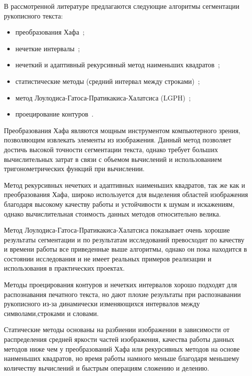 В рассмотренной литературе предлагаются следующие алгоритмы сегментации рукописного текста:
\begin{itemize}
  \item преобразования Хафа~\cite{louloudis_gatos_pratikakis_halatsis};
  \item нечеткие интервалы~\cite{louloudis_gatos_pratikakis_halatsis};
  \item нечеткий и адаптивный рекурсивный метод наименьших \mbox{квадратов~\cite{louloudis_gatos_pratikakis_halatsis};}
  \item статистические методы (средний интервал между строками)~\cite{gomathi_umadevi_mohanavel};
  \item метод Лоулодиса-Гатоса-Пратикакиса-Халатсиса (LGPH)~\cite{louloudis_gatos_pratikakis_halatsis};
  \item проецирование контуров~\cite{louloudis_gatos_pratikakis_halatsis}.
\end{itemize}

Преобразования Хафа являются мощным инструментом компьютерного зрения, позволяющим извлекать элементы из изображения. Данный метод позволяет достичь высокой точности сегментации текста, однако требует больших вычислительных затрат в связи с объемом вычислений и использованием тригонометрических функций при вычислении.

Метод рекурсивных нечетких и адаптивных наименьших квадратов, так же как и преобразования Хафа, широко используется для выделения областей изображения благодаря высокому качеству работы и устойчивости к шумам и искажениям, однако вычислительная стоимость данных методов относительно велика.

Метод Лоулодиса-Гатоса-Пратикакиса-Халатсиса показывает очень хорошие результаты сегментации и по результатам исследований превосходит по качеству и времени работы все приведенные выше алгоритмы, однако он пока находится в состоянии исследования и не имеет реальных примеров реализации и использования в практических проектах.

Методы проецирования контуров и нечетких интервалов хорошо подходят для распознавания печатного текста, но дают плохие результаты при распознавании рукописного из-за динамически изменяющихся интервалов между символами,строками и словами.

Статические методы основаны на разбиении изображении в зависимости от распределения средней яркости частей изображения, качества работы данных методов ниже чем у преобразований Хафа или рекурсивных методов на основе наименьших квадратов, но время работы намного меньше благодаря меньшему количеству вычислений и быстрым операциям сложению и делению.

